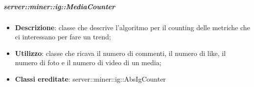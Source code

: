 	\subparagraph{server::miner::ig::MediaCounter} %
		\label{subp:server_miner_ig_MediaCounter}
			\begin{itemize}
				\item \textbf{Descrizione}: classe che descrive l'algoritmo per il counting delle metriche che ci interessano per fare un trend;
				\item \textbf{Utilizzo}: classe che ricava il numero di commenti, il numero di like, il numero di foto e il numero di video di un media;
				\item \textbf{Classi ereditate}: server::miner::ig::AbsIgCounter
			\end{itemize}


